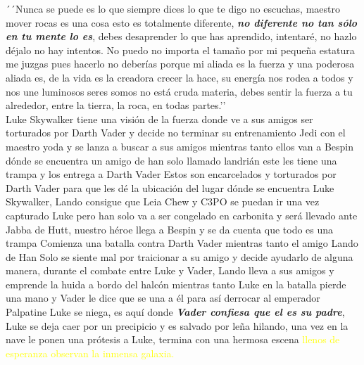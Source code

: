\documentclass[11pt, a5paper]{article}
\begin{document}
{{´´Nunca se puede es lo que siempre dices lo que te digo no escuchas, maestro mover rocas es una cosa esto es totalmente diferente, {\slshape\textbf{no diferente no tan sólo en tu mente lo es}}, debes desaprender lo que has aprendido, intentaré, no hazlo déjalo no hay intentos. No puedo no importa el tamaño por mi pequeña estatura me juzgas pues hacerlo no deberías porque mi aliada es la fuerza y una poderosa aliada es, de la vida es la creadora crecer la hace, su energía nos rodea a todos y nos une luminosos seres somos no está cruda materia, debes sentir la fuerza a tu alrededor, entre la tierra, la roca, en todas partes.’’\\ 
Luke Skywalker tiene una visión de la fuerza donde ve a sus amigos ser torturados por Darth Vader y decide no terminar su entrenamiento Jedi con el maestro yoda y se lanza a buscar a sus amigos mientras tanto ellos van a Bespin dónde se encuentra un amigo de han solo llamado landrián este les tiene una trampa y los entrega a Darth Vader Estos son encarcelados y torturados por Darth Vader para que les dé la ubicación del lugar dónde se encuentra Luke Skywalker, Lando consigue que Leia Chew y C3PO se puedan ir una vez capturado Luke pero han solo va a ser congelado en carbonita y será llevado ante Jabba de Hutt,  nuestro héroe llega a Bespin y se da cuenta que todo es una trampa Comienza una batalla contra Darth Vader mientras tanto el amigo Lando de Han Solo se siente mal por traicionar a su amigo y decide ayudarlo de alguna manera, durante el combate entre Luke y Vader, Lando lleva a sus amigos y emprende la huida a bordo del halcón mientras tanto Luke en la batalla pierde una mano y Vader le dice que se una a él para así derrocar al emperador Palpatine Luke se niega, es aquí donde {\itshape\textbf{Vader confiesa que el es su padre}}, Luke se deja caer por un precipicio y es salvado por leña hilando, una vez en la nave le ponen una prótesis a Luke, termina con una hermosa escena {\textcolor{yellow}{llenos de esperanza observan la inmensa galaxia.}}\\}}
\end{document}
